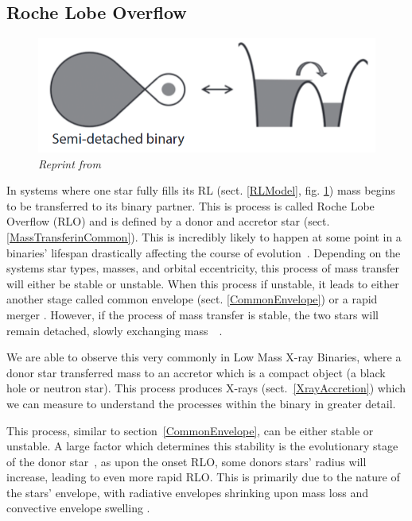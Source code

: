 \documentclass[12pt, a4paper]{article}
\begin{document}
        \subsection{\centering Roche Lobe Overflow}\label{RLO} %

        \begin{figure}[h] 
            \centering
            \includegraphics[scale = .4]{Figs/Semi-detached binary.png}
            \caption{\textit{Reprint from~\parencite{TaurisvandenHeuvel+2023}}}
            \label{SemidetachedRL}
        \end{figure}

        In systems where one star fully fills its RL (sect. \ref{RLModel}, fig. \ref{SemidetachedRL}) mass begins to be transferred to its binary partner. This is process is called Roche Lobe Overflow (RLO) and is defined by a donor and accretor star (sect. \ref{MassTransferinCommon}). This is incredibly likely to happen at some point in a binaries' lifespan drastically affecting the course of evolution~\parencite{TaurisvandenHeuvel+2023}\parencite{Chen_2024}. Depending on the systems star types, masses, and orbital eccentricity, this process of mass transfer will either be stable or unstable. When this process if unstable, it leads to either another stage called common envelope (sect. \ref{CommonEnvelope}) or a rapid merger \parencite{TaurisvandenHeuvel+2023}. However, if the process of mass transfer is stable, the two stars will remain detached, slowly exchanging mass~\parencite{Chen_2024}~\parencite{TaurisvandenHeuvel+2023}.

        We are able to observe this very commonly in Low Mass X-ray Binaries, where a donor star transferred mass to an accretor which is a compact object (a black hole or neutron star). This process produces X-rays (sect.~\ref{XrayAccretion}) which we can measure to understand the processes within the binary in greater detail.

        This process, similar to section~\ref{CommonEnvelope}, can be either stable or unstable. A large factor which determines this stability is the evolutionary stage of the donor star~\parencite{TaurisvandenHeuvel+2023}, as upon the onset RLO, some donors stars' radius will increase, leading to even more rapid RLO. This is primarily due to the nature of the stars' envelope, with radiative envelopes shrinking upon mass loss and convective envelope swelling \parencite{TaurisvandenHeuvel+2023}.
        
\end{document}
